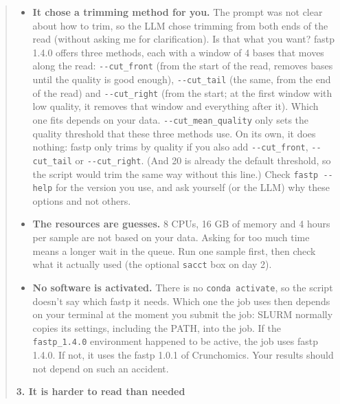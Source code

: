 \documentclass[
  letterpaper,
  DIV=11,
  numbers=noendperiod]{scrreprt}
\providecommand{\tightlist}{%
  \setlength{\itemsep}{0pt}\setlength{\parskip}{0pt}}
\begin{document}
\begin{tcolorbox}
\begin{quote}
\begin{itemize}
\tightlist
\item
  \textbf{It chose a trimming method for you.} The prompt was not clear
  about how to trim, so the LLM chose trimming from both ends of the
  read (without asking me for clarification). Is that what you want?
  fastp 1.4.0 offers three methods, each with a window of 4 bases that
  moves along the read: \texttt{-\/-cut\_front} (from the start of the
  read, removes bases until the quality is good enough),
  \texttt{-\/-cut\_tail} (the same, from the end of the read) and
  \texttt{-\/-cut\_right} (from the start; at the first window with low
  quality, it removes that window and everything after it). Which one
  fits depends on your data. \texttt{-\/-cut\_mean\_quality} only sets
  the quality threshold that these three methods use. On its own, it
  does nothing: fastp only trims by quality if you also add
  \texttt{-\/-cut\_front}, \texttt{-\/-cut\_tail} or
  \texttt{-\/-cut\_right}. (And 20 is already the default threshold, so
  the script would trim the same way without this line.) Check
  \texttt{fastp\ -\/-help} for the version you use, and ask yourself (or
  the LLM) why these options and not others.
\item
  \textbf{The resources are guesses.} 8 CPUs, 16 GB of memory and 4
  hours per sample are not based on your data. Asking for too much time
  means a longer wait in the queue. Run one sample first, then check
  what it actually used (the optional \texttt{sacct} box on day 2).
\item
  \textbf{No software is activated.} There is no
  \texttt{conda\ activate}, so the script doesn't say which fastp it
  needs. Which one the job uses then depends on your terminal at the
  moment you submit the job: SLURM normally copies its settings,
  including the PATH, into the job. If the \texttt{fastp\_1.4.0}
  environment happened to be active, the job uses fastp 1.4.0. If not,
  it uses the fastp 1.0.1 of Crunchomics. Your results should not depend
  on such an accident.
\end{itemize}

\textbf{3. It is harder to read than needed}


\end{quote}
\end{tcolorbox}
\end{document}
